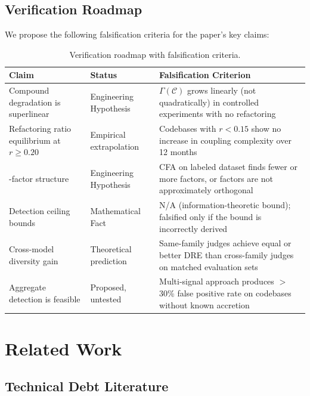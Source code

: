 \documentclass[11pt, a4paper, copyright]{googledeepmind}
\begin{document}
\subsection{Verification Roadmap}

We propose the following falsification criteria for the paper's key claims:

\begin{table}[htbp]
\centering
\caption{Verification roadmap with falsification criteria.}
\label{tab:verification}
\small
\begin{tabular}{@{}p{3.5cm} p{3.5cm} p{5cm}@{}}
\toprule
\textbf{Claim} & \textbf{Status} & \textbf{Falsification Criterion} \\
\midrule
Compound degradation is superlinear & Engineering Hypothesis & $\Gamma(\mathcal{C})$ grows linearly (not quadratically) in controlled experiments with no refactoring \\
\addlinespace
Refactoring ratio equilibrium at $r \geq 0.20$ & Empirical extrapolation & Codebases with $r < 0.15$ show no increase in coupling complexity over 12 months \\
\addlinespace
3-factor structure & Engineering Hypothesis & CFA on labeled dataset finds fewer or more factors, or factors are not approximately orthogonal \\
\addlinespace
Detection ceiling bounds & Mathematical Fact & N/A (information-theoretic bound); falsified only if the bound is incorrectly derived \\
\addlinespace
Cross-model diversity gain & Theoretical prediction & Same-family judges achieve equal or better DRE than cross-family judges on matched evaluation sets \\
\addlinespace
Aggregate detection is feasible & Proposed, untested & Multi-signal approach produces $>$ 30\% false positive rate on codebases without known accretion \\
\bottomrule
\end{tabular}
\end{table}


\section{Related Work}
\label{sec:related}

\subsection{Technical Debt Literature}
\end{document}
